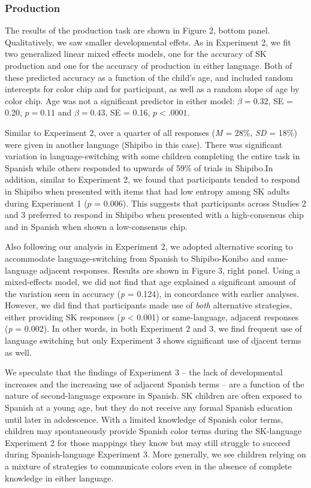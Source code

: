 \documentclass[,man,floatsintext]{apa6}
\theoremstyle{definition}
\theoremstyle{definition}
\theoremstyle{definition}
\theoremstyle{remark}
\begin{document}
\subsubsection{Production}\label{production-1}

The results of the production task are shown in Figure 2, bottom panel.
Qualitatively, we saw smaller developmental effets. As in Experiment 2,
we fit two generalized linear mixed effects models, one for the accuracy
of SK production and one for the accuracy of production in either
language. Both of these predicted accuracy as a function of the child's
age, and included random intercepts for color chip and for participant,
as well as a random slope of age by color chip. Age was not a
significant predictor in either model: \(\beta = 0.32\), SE = 0.20,
\(p = 0.11\) and \(\beta = 0.43\), SE = 0.16, \(p < .0001\).

Similar to Experiment 2, over a quarter of all responses (\emph{M} =
28\%, \emph{SD} = 18\%) were given in another language (Shipibo in this
case). There was significant variation in language-switching with some
children completing the entire task in Spanish while others responded to
upwards of 59\% of trials in Shipibo.In addition, similar to Experiment
2, we found that participants tended to respond in Shipibo when
presented with items that had low entropy among SK adults during
Experiment 1 (\(p\) = 0.006). This suggests that participants across
Studies 2 and 3 preferred to respond in Shipibo when presented with a
high-consensus chip and in Spanish when shown a low-consensus chip.

Also following our analysis in Experiment 2, we adopted alternative
scoring to accommodate language-switching from Spanish to Shipibo-Konibo
and same-language adjacent responses. Results are shown in Figure 3,
right panel. Using a mixed-effects model, we did not find that age
explained a significant amount of the variation seen in accuracy
(\emph{p} = 0.124), in concordance with earlier analyses. However, we
did find that participants made use of \emph{both} alternative
strategies, either providing SK responses (\emph{p} \textless{} 0.001)
or same-language, adjacent responses (\emph{p} = 0.002). In other words,
in both Experiment 2 and 3, we find frequent use of language switching
but only Experiment 3 shows significant use of djacent terms as well.

We speculate that the findings of Experiment 3 -- the lack of
developmental increases and the increasing use of adjacent Spanish terms
-- are a function of the nature of second-language exposure in Spanish.
SK children are often exposed to Spanish at a young age, but they do not
receive any formal Spanish education until later in adolescence. With a
limited knowledge of Spanish color terms, children may spontaneously
provide Spanish color terms during the SK-language Experiment 2 for
those mappings they know but may still struggle to succeed during
Spanish-language Experiment 3. More generally, we see children relying
on a mixture of strategies to communicate colors even in the absence of
complete knowledge in either language.
\end{document}
